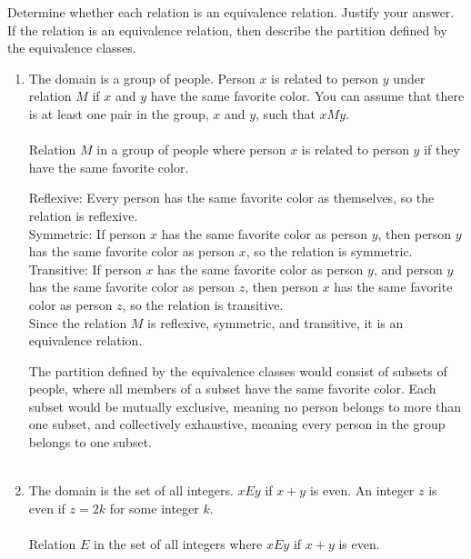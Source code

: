 \documentclass{amsart}
\theoremstyle{definition}
\theoremstyle{Exercise}
\theoremstyle{remark}
\theoremstyle{rule}
\numberwithin{equation}{section}
\begin{document}
Determine whether each relation is an equivalence relation. Justify your answer. If the relation is an equivalence relation, then describe the partition defined by the equivalence classes.\\
\begin{enumerate}[label=(\alph*)]
\item The domain is a group of people. Person $x$ is related to person $y$ under relation $M$ if $x$ and $y$ have the same favorite color. You can assume that there is at least one pair in the group, $x$ and $y$, such that $xMy$.\\\\
Relation \( M \) in a group of people where person \( x \) is related to person \( y \) if they have the same favorite color.

Reflexive: Every person has the same favorite color as themselves, so the relation is reflexive.\\
Symmetric: If person \( x \) has the same favorite color as person \( y \), then person \( y \) has the same favorite color as person \( x \), so the relation is symmetric.\\
Transitive: If person \( x \) has the same favorite color as person \( y \), and person \( y \) has the same favorite color as person \( z \), then person \( x \) has the same favorite color as person \( z \), so the relation is transitive.\\

Since the relation \( M \) is reflexive, symmetric, and transitive, it is an equivalence relation.

The partition defined by the equivalence classes would consist of subsets of people, where all members of a subset have the same favorite color. Each subset would be mutually exclusive, meaning no person belongs to more than one subset, and collectively exhaustive, meaning every person in the group belongs to one subset.
\\\\

\item The domain is the set of all integers. $xEy$ if $x + y$ is even. An integer $z$ is even if $z = 2k$ for some integer $k$.\\\\
Relation \( E \) in the set of all integers where \( xEy \) if \( x + y \) is even.


\end{enumerate}
\end{document}

